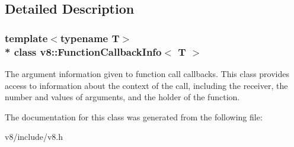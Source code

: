 \subsection{Detailed Description}
\subsubsection*{template$<$typename T$>$\\*
class v8\+::\+Function\+Callback\+Info$<$ T $>$}

The argument information given to function call callbacks. This class provides access to information about the context of the call, including the receiver, the number and values of arguments, and the holder of the function. 

The documentation for this class was generated from the following file\+:\begin{DoxyCompactItemize}
\item 
v8/include/v8.\+h\end{DoxyCompactItemize}
